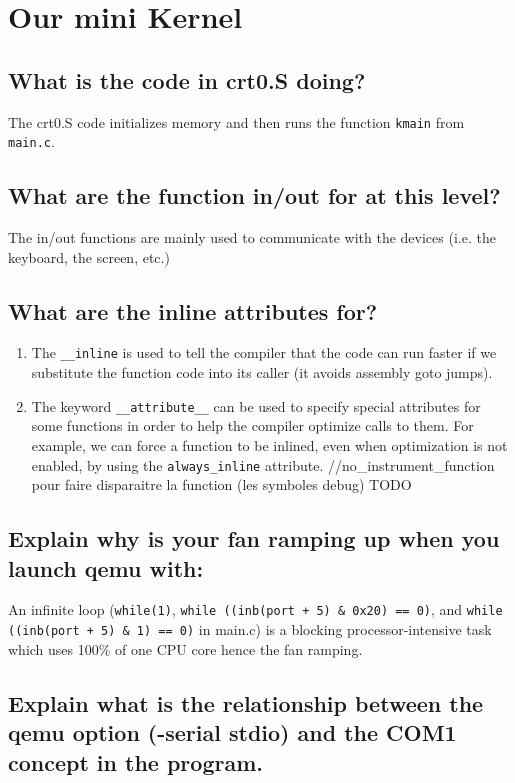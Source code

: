 \documentclass[10]{article}
\begin{document}
\section{Our mini Kernel}

\subsection{What is the code in crt0.S doing?}
The crt0.S code initializes memory and then runs the function \texttt{kmain} from \texttt{main.c}.

\subsection{What are the function in/out for at this level?}
The in/out functions are mainly used to communicate with the devices (i.e. the keyboard, the screen, etc.)
\subsection{What are the inline attributes for?}
\begin{enumerate}
 	\item
 	The \texttt{\_\_inline} is used to tell the compiler that the code can run faster if we substitute the function code into its caller (it avoids assembly goto jumps).
 	\item
 	The keyword \texttt{\_\_attribute\_\_} can be used to specify special attributes for some functions in order to help the compiler optimize calls to them. For example, we can force a function to be inlined, even when optimization is not enabled, by using the \texttt{always\_inline} attribute.
//no_instrument_function pour faire disparaitre la function (les symboles debug)
TODO

\end{enumerate}
\subsection{Explain why is your fan ramping up when you launch qemu with:}
An infinite loop (\texttt{while(1)}, \texttt{while ((inb(port + 5) & 0x20) == 0)}, and \texttt{while ((inb(port + 5) & 1) == 0)} in main.c) is a blocking processor-intensive task which uses 100\% of one CPU core hence the fan ramping.

\subsection{Explain what is the relationship between the qemu option (-serial stdio) and the COM1 concept in the program.}
\end{document}
